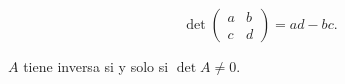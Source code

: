 
\begin{frame}

\begin{definition}
\[
  \det \begin{pmatrix} a & b \\ c & d \end{pmatrix} = ad - bc .
\]
\end{definition}

\begin{proposition}
$A$ tiene inversa si y solo si $\det A \neq 0$.
\end{proposition}
\end{frame}
